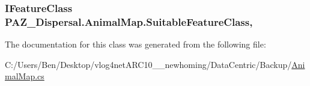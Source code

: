 \hypertarget{class_p_a_z___dispersal_1_1_animal_map_a1b42214a1c3f84954e327bd3c8e7472c}{
\subsubsection[{Suitable\-Feature\-Class}]{\setlength{\rightskip}{0pt plus 5cm}I\-Feature\-Class P\-A\-Z\-\_\-\-Dispersal.\-Animal\-Map.\-Suitable\-Feature\-Class\hspace{0.3cm}{\ttfamily [get]}, {\ttfamily [set]}}}\label{class_p_a_z___dispersal_1_1_animal_map_a1b42214a1c3f84954e327bd3c8e7472c}


The documentation for this class was generated from the following file\-:\begin{DoxyCompactItemize}
\item 
C\-:/\-Users/\-Ben/\-Desktop/vlog4net\-A\-R\-C10\-\_\-\_\-newhoming/\-Data\-Centric/\-Backup/\hyperlink{_backup_2_animal_map_8cs}{Animal\-Map.\-cs}\end{DoxyCompactItemize}
